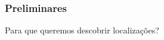 \documentclass{beamer}
\begin{document}
\begin{frame}
	\frametitle{\normalsize Preliminares} 
	 \begin{center} 
	 	\large Para que queremos descobrir localizações?
	 \end{center}

	\begin{figure}
		
		\hspace{0.3cm}
		\\
		
	\end{figure}
\end{frame}
\end{document}
